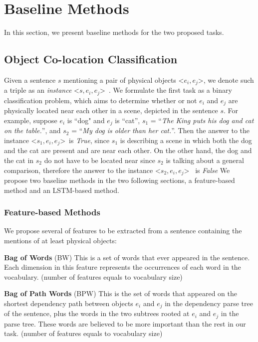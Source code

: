 \section{Baseline Methods}
\label{sec:method}
In this section, we present baseline methods for 
the two proposed tasks. 

\subsection{Object Co-location Classification}
\label{sec:classify} 
Given a sentence $s$ mentioning a pair of physical objects 
\textless$e_i,e_j$\textgreater, 
we denote such a triple as an \textit{instance} \textless$s,e_i,e_j$\textgreater~. 
We formulate the first task as a binary classification problem, which aims to determine whether or not $e_i$ and $e_j$ are physically located near each other 
in a scene, depicted in the sentence $s$.
For example, suppose $e_i$ is ``dog" and $e_j$ is ``cat'', $s_1$ = ``\textit{The King puts his dog and cat on the table.}'', 
and $s_2$ = ``\textit{My dog is older than her cat.}''.
Then the answer to the instance \textless$s_1,e_i,e_j$\textgreater ~is \textit{True}, 
since $s_1$ is describing a scene in which both the dog and the cat are present
and are near each other.
On the other hand, the dog and the cat in $s_2$ do not have to be 
located near since $s_2$ is talking about a general comparison, 
therefore the answer to  the instance \textless$s_2,e_i,e_j$\textgreater~
is \textit{False}
We propose two baseline methods in the two following sections, 
a feature-based method and an LSTM-based method.

\subsubsection{Feature-based Methods}
We propose several of features to be extracted from 
a sentence containing the mentions of at least physical objects:

\noindent
\textbf{Bag of Words} (BW)
This is a set of words that ever appeared in
the sentence. Each dimension in this feature represents the occurrences of each word in the vocabulary. (number of features equals to vocabulary size)

\noindent
\textbf{Bag of Path Words} (BPW)
This is the set of words that appeared on
the shortest dependency path between objects $e_i$ and $e_j$ in the dependency parse
tree of the sentence, plus the words in the two subtrees rooted at $e_i$ and
$e_j$ in the parse tree. These words are believed to be more important
than the rest in our task. (number of features equals to vocabulary size)

